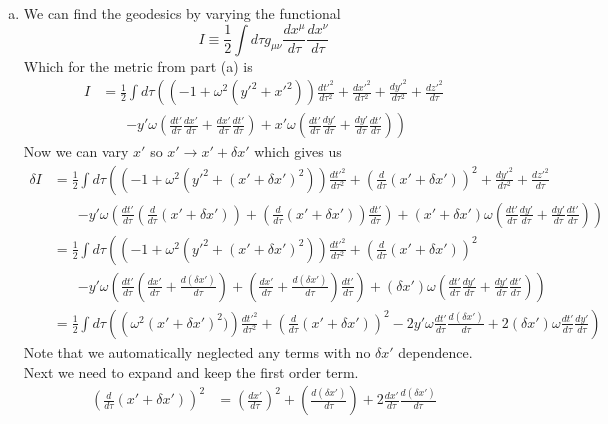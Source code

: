 \documentclass[11pt]{article}
\numberwithin{equation}{section}
\begin{document}
\begin{enumerate}[(a)]
\item
We can find the geodesics by varying the functional 
$$I \equiv \frac{1}{2}\int d\tau g_{\mu\nu}\frac{dx^{\mu}}{d\tau}\frac{dx^{\nu}}{d\tau}$$
Which for the metric from part (a) is
\begin{align*}
I &= \frac{1}{2}\int d\tau \left(\left(-1 + \omega^2(y'^2 + x'^2)\right)\frac{dt'^2}{d\tau^2} + \frac{dx'^2}{d\tau^2} + \frac{dy'^2}{d\tau^2}  + \frac{dz'^2}{d\tau}\right.\\
&\ \ \ \ \ \ \ \ \left. - y'\omega\left(\frac{dt'}{d\tau}\frac{dx'}{d\tau} + \frac{dx'}{d\tau}\frac{dt'}{d\tau}\right) + x'\omega \left(\frac{dt'}{d\tau}\frac{dy'}{d\tau} + \frac{dy'}{d\tau}\frac{dt'}{d\tau}\right)\right)
\end{align*}
Now we can vary $x'$ so $x'\rightarrow x'+\delta x'$ which gives us
\begin{align*}
\delta I &= \frac{1}{2}\int d\tau \left(\left(-1 + \omega^2(y'^2 + (x'+\delta x')^2)\right)\frac{dt'^2}{d\tau^2} + \left(\frac{d}{d\tau}(x'+\delta x')\right)^2 + \frac{dy'^2}{d\tau^2}  + \frac{dz'^2}{d\tau}\right.\\
&\ \ \ \ \ \ \ \ \left. - y'\omega\left(\frac{dt'}{d\tau}\left(\frac{d}{d\tau}(x'+\delta x')\right) + \left(\frac{d}{d\tau}(x'+\delta x')\right)\frac{dt'}{d\tau}\right) + (x'+\delta x')\omega \left(\frac{dt'}{d\tau}\frac{dy'}{d\tau} + \frac{dy'}{d\tau}\frac{dt'}{d\tau}\right)\right)\\
&= \frac{1}{2}\int d\tau \left(\left(-1 + \omega^2(y'^2 + (x'+\delta x')^2)\right)\frac{dt'^2}{d\tau^2} + \left(\frac{d}{d\tau}(x'+\delta x')\right)^2 \right.\\
&\ \ \ \ \ \ \ \ \left. - y'\omega\left(\frac{dt'}{d\tau}\left(\frac{dx'}{d\tau}+\frac{d(\delta x')}{d\tau}\right) + \left(\frac{dx'}{d\tau}+\frac{d(\delta x')}{d\tau}\right)\frac{dt'}{d\tau}\right) + (\delta x')\omega \left(\frac{dt'}{d\tau}\frac{dy'}{d\tau} + \frac{dy'}{d\tau}\frac{dt'}{d\tau}\right)\right)\\
&= \frac{1}{2}\int d\tau \left(\left(\omega^2(x'+\delta x')^2)\right)\frac{dt'^2}{d\tau^2} + \left(\frac{d}{d\tau}(x'+\delta x')\right)^2  - 2y'\omega\frac{dt'}{d\tau}\frac{d(\delta x')}{d\tau} + 2(\delta x')\omega\frac{dt'}{d\tau}\frac{dy'}{d\tau}\right)
\end{align*}
Note that we automatically neglected any terms with no $\delta x'$ dependence. Next we need to expand and keep the first order term.
\begin{align*}
\left(\frac{d}{d\tau}(x'+\delta x')\right)^2 &= \left(\frac{dx'}{d\tau}\right)^2+ \left(\frac{d(\delta x')}{d\tau}\right) + 2\frac{dx'}{d\tau}\frac{d(\delta x')}{d\tau}\\

\end{align*}
\end{enumerate}
\end{document}

